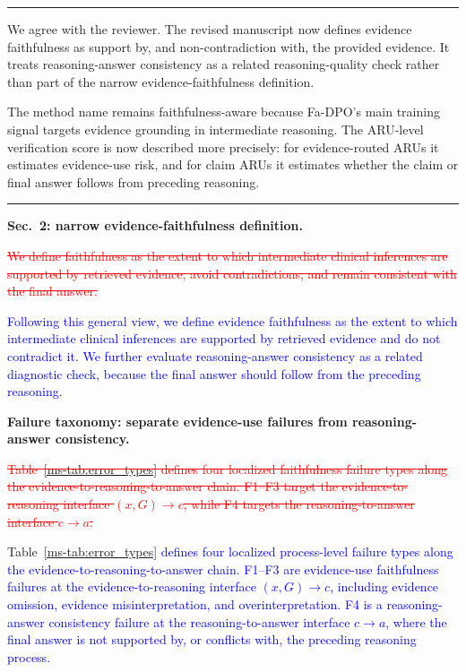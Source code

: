 \documentclass[12pt]{article}
\newcommand{\deleted}[1]{\textcolor{red}{\sout{#1}}}
\newcommand{\added}[1]{\textcolor{blue}{#1}}
\newcommand{\responseheading}[1]{%
    \vspace{0.24cm}
    \par\noindent{\large\bfseries #1}\par
    \vspace{0.03cm}
    \noindent\rule{\linewidth}{0.35pt}\par
    \vspace{0.06cm}
    \noindent\ignorespaces
}
\begin{document}
\responseheading{Response and Revision Summary}
We agree with the reviewer. The revised manuscript now defines evidence faithfulness
as support by, and non-contradiction with, the provided evidence. It treats
reasoning-answer consistency as a related reasoning-quality check rather than part of
the narrow evidence-faithfulness definition.

The method name remains faithfulness-aware because Fa-DPO's main training signal
targets evidence grounding in intermediate reasoning. The ARU-level verification
score is now described more precisely: for evidence-routed ARUs it estimates
evidence-use risk, and for claim ARUs it estimates whether the claim or final answer
follows from preceding reasoning.

\responseheading{Revision Details}
\textbf{Sec.~2: narrow evidence-faithfulness definition.}

\begin{displayquote}
\deleted{We define faithfulness as the extent to which intermediate clinical inferences are supported by retrieved evidence, avoid contradictions, and remain consistent with the final answer.}

\added{Following this general view, we define evidence faithfulness as the extent to which intermediate clinical inferences are supported by retrieved evidence and do not contradict it. We further evaluate reasoning-answer consistency as a related diagnostic check, because the final answer should follow from the preceding reasoning.}
\end{displayquote}

\textbf{Failure taxonomy: separate evidence-use failures from reasoning-answer consistency.}

\begin{displayquote}
\deleted{Table~\ref*{ms-tab:error_types} defines four localized faithfulness failure types along the evidence-to-reasoning-to-answer chain. F1--F3 target the evidence-to-reasoning interface $(x,G)\rightarrow c$, while F4 targets the reasoning-to-answer interface $c\rightarrow a$.}

Table~\ref*{ms-tab:error_types} \added{defines four localized process-level failure types along the evidence-to-reasoning-to-answer chain. F1--F3 are evidence-use faithfulness failures at the evidence-to-reasoning interface $(x,G)\rightarrow c$, including evidence omission, evidence misinterpretation, and overinterpretation. F4 is a reasoning-answer consistency failure at the reasoning-to-answer interface $c\rightarrow a$, where the final answer is not supported by, or conflicts with, the preceding reasoning process.}
\end{displayquote}
\end{document}
